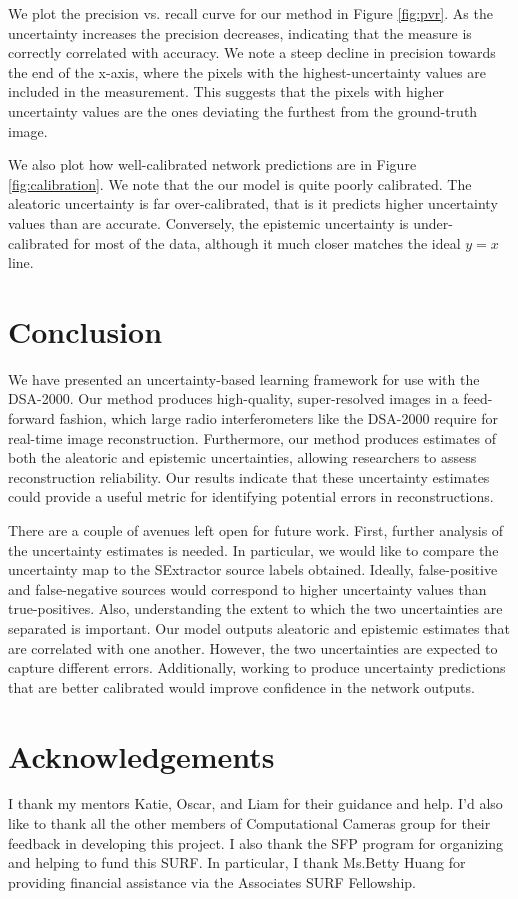 \documentclass{article}
\begin{document}
We plot the precision vs. recall curve for our method in Figure \ref{fig:pvr}. As the uncertainty increases the precision decreases, indicating that the measure is correctly correlated with accuracy. We note a steep decline in precision towards the end of the x-axis, where the pixels with the highest-uncertainty values are included in the measurement. This suggests that the pixels with higher uncertainty values are the ones deviating the furthest from the ground-truth image.

We also plot how well-calibrated network predictions are in Figure \ref{fig:calibration}. We note that the our model is quite poorly calibrated. The aleatoric uncertainty is far over-calibrated, that is it predicts higher uncertainty values than are accurate. Conversely, the epistemic uncertainty is under-calibrated for most of the data, although it much closer matches the ideal $y=x$ line.

\section{Conclusion}

We have presented an uncertainty-based learning framework for use with the DSA-2000. Our method produces high-quality, super-resolved images in a feed-forward fashion, which large radio interferometers like the DSA-2000 require for real-time image reconstruction. Furthermore, our method produces estimates of both the aleatoric and epistemic uncertainties, allowing researchers to assess reconstruction reliability. Our results indicate that these uncertainty estimates could provide a useful metric for identifying potential errors in reconstructions.

There are a couple of avenues left open for future work. First, further analysis of the uncertainty estimates is needed. In particular, we would like to compare the uncertainty map to the SExtractor source labels obtained. Ideally, false-positive and false-negative sources would correspond to higher uncertainty values than true-positives. Also, understanding the extent to which the two uncertainties are separated is important. Our model outputs aleatoric and epistemic estimates that are correlated with one another. However, the two uncertainties are expected to capture different errors. Additionally, working to produce uncertainty predictions that are better calibrated would improve confidence in the network outputs.

\section{Acknowledgements}

I thank my mentors Katie, Oscar, and Liam for their guidance and help. I'd also like to thank all the other members of Computational Cameras group for their feedback in developing this project. I also thank the SFP program for organizing and helping to fund this SURF. In particular, I thank Ms.\@ Betty Huang for providing financial assistance via the Associates SURF Fellowship. 






\end{document}
